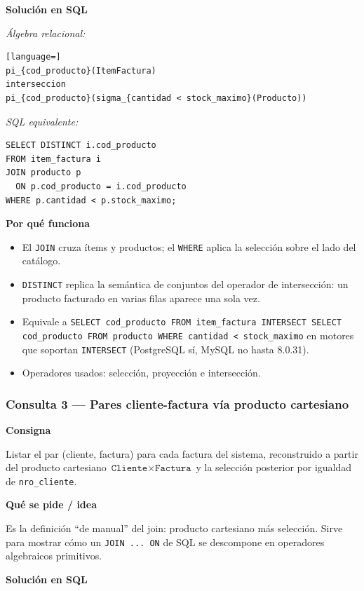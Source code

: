 \documentclass[11pt,a4paper]{article}
\newcommand{\itemcabecera}[1]{\noindent\textbf{#1}\par\medskip}
\newcommand{\bloqueConsigna}{\itemcabecera{Consigna}}
\newcommand{\bloqueIdea}{\itemcabecera{Qu\'e se pide / idea}}
\newcommand{\bloqueSolucion}{\itemcabecera{Soluci\'on en SQL}}
\newcommand{\bloquePorque}{\itemcabecera{Por qu\'e funciona}}
\begin{document}
\bloqueSolucion

\textit{Álgebra relacional:}

\begin{lstlisting}[language=]
pi_{cod_producto}(ItemFactura)
interseccion
pi_{cod_producto}(sigma_{cantidad < stock_maximo}(Producto))
\end{lstlisting}

\textit{SQL equivalente:}

\begin{lstlisting}
SELECT DISTINCT i.cod_producto
FROM item_factura i
JOIN producto p
  ON p.cod_producto = i.cod_producto
WHERE p.cantidad < p.stock_maximo;
\end{lstlisting}

\bloquePorque

\begin{itemize}
    \item El \texttt{JOIN} cruza ítems y productos; el \texttt{WHERE} aplica la selección sobre el lado del catálogo.
    \item \texttt{DISTINCT} replica la semántica de conjuntos del operador de intersección: un producto facturado en varias filas aparece una sola vez.
    \item Equivale a \texttt{SELECT cod\_producto FROM item\_factura INTERSECT SELECT cod\_producto FROM producto WHERE cantidad < stock\_maximo} en motores que soportan \texttt{INTERSECT} (PostgreSQL sí, MySQL no hasta 8.0.31).
    \item Operadores usados: selección, proyección e intersección.
\end{itemize}

\subsubsection*{Consulta 3 --- Pares cliente-factura vía producto cartesiano}

\bloqueConsigna

Listar el par (cliente, factura) para cada factura del sistema, reconstruido a partir del producto cartesiano $\texttt{Cliente} \times \texttt{Factura}$ y la selección posterior por igualdad de \texttt{nro\_cliente}.

\bloqueIdea

Es la definición ``de manual'' del join: producto cartesiano más selección. Sirve para mostrar cómo un \texttt{JOIN ... ON} de SQL se descompone en operadores algebraicos primitivos.

\bloqueSolucion
\end{document}
